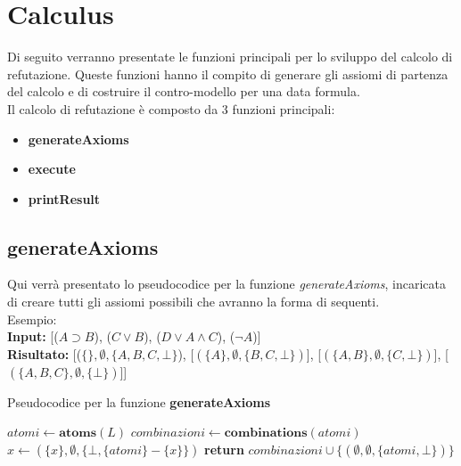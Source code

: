 \documentclass[\main/tesi.tex]{subfiles}
\begin{document}
\newpage

\section{Calculus}

Di seguito verranno presentate le funzioni principali per lo sviluppo del calcolo di refutazione. Queste funzioni hanno il compito di generare gli assiomi di partenza del calcolo e di costruire il contro-modello per una data formula. \\

Il calcolo di refutazione è composto da 3 funzioni principali:
\begin{itemize}
    \item \textbf{generateAxioms}
    \item \textbf{execute}
    \item \textbf{printResult}
\end{itemize}

\subsection{generateAxioms}
Qui verrà presentato lo pseudocodice per la funzione \textit{generateAxioms}, incaricata di creare tutti gli assiomi possibili che avranno la forma di sequenti. \\
Esempio: \\
\textbf{Input:} [($A \supset B$), ($C \lor B$), ($D \lor A \land C$), ($\neg A$)] \\
\textbf{Risultato:} [($\{\}, \emptyset, \{A, B, C, \bot\}$), [$(\{A\}, \emptyset, \{B, C, \bot\})$], [$(\{A, B\}, \emptyset, \{C, \bot\})$], [$(\{A, B, C\}, \emptyset, \{\bot\})$]]

\begin{algorithm}
    \caption{Pseudocodice per la funzione \textbf{generateAxioms}}\label{alg:generateAxioms}
    \begin{algorithmic}
        \State $atomi \gets \textbf{atoms}(L)$
        \State $combinazioni \gets \textbf{combinations}(atomi)$
        \State $x \gets (\{x\}, \emptyset, \{\bot, \{atomi\} - \{x\}\})$
        \EndFor
        \State \textbf{return} $combinazioni \cup \{(\emptyset, \emptyset, \{atomi, \bot\})\}$
        \EndFunction
    \end{algorithmic}
\end{algorithm}

\newpage
\end{document}
